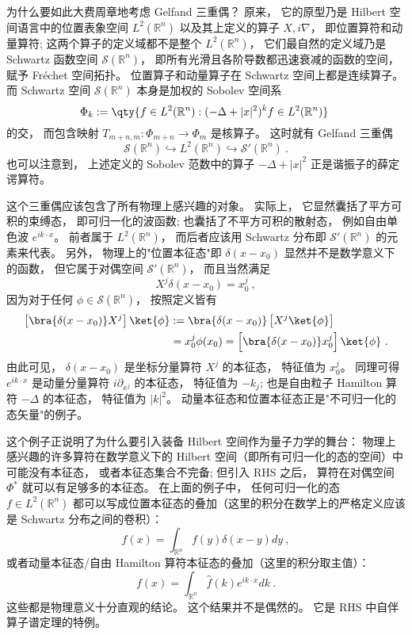     为什么要如此大费周章地考虑 Gelfand 三重偶？ 原来， 它的原型乃是 Hilbert 空间语言中的位置表象空间 $L^2(\mathbb{R}^n)$ 以及其上定义的算子 $X,i\nabla$， 即位置算符和动量算符; 这两个算子的定义域都不是整个 $L^2(\mathbb{R}^n)$， 它们最自然的定义域乃是 Schwartz 函数空间 $\mathcal{S}(\mathbb{R}^n)$， 即所有光滑且各阶导数都迅速衰减的函数的空间， 赋予 Fréchet 空间拓扑。 位置算子和动量算子在 Schwartz 空间上都是连续算子。 而 Schwartz 空间 $\mathcal{S}(\mathbb{R}^n)$ 本身是加权的 Sobolev 空间系
$$
\Phi_k := \qty{f \in L^2 (\mathbb{R}^n): (-\Delta + |x|^ 2)^{k} f \in L^2 (\mathbb{R}^n) }~
$$
的交， 而包含映射 $T_{m+n,m}:\Phi_{m+n}\to\Phi_m$ 是核算子。 这时就有 Gelfand 三重偶$$
\mathcal{S}(\mathbb{R}^n)\hookrightarrow L^2(\mathbb{R}^n)\hookrightarrow \mathcal{S}'(\mathbb{R}^n)~.
$$也可以注意到， 上述定义的 Sobolev 范数中的算子 $-\Delta+|x|^2$ 正是谐振子的薛定谔算符。

    这个三重偶应该包含了所有物理上感兴趣的对象。 实际上， 它显然囊括了平方可积的束缚态， 即可归一化的波函数; 也囊括了不平方可积的散射态， 例如自由单色波 $e^{ik\cdot x}$。 前者属于 $L^2(\mathbb{R}^n)$， 而后者应该用 Schwartz 分布即 $\mathcal{S}'(\mathbb{R}^n)$ 的元素来代表。 另外， 物理上的"位置本征态"即 $\delta(x-x_0)$ 显然并不是数学意义下的函数， 但它属于对偶空间 $\mathcal{S}'(\mathbb{R}^n)$， 而且当然满足
$$
X^j\delta(x-x_0)=x_0^j~,
$$
因为对于任何 $\phi\in\mathcal{S}(\mathbb{R}^n)$， 按照定义皆有
$$
\begin{aligned}
\left[\bra{\delta(x-x_0)}X^j\right]\ket{\phi}
&:=\bra{\delta(x-x_0)}\left[X^j\ket{\phi}\right]\\
&=x_0^j\phi(x_0)
=\left[\bra{\delta(x-x_0)}x_0^j\right]\ket{\phi}~.
\end{aligned}
$$
由此可见， $\delta(x-x_0)$ 是坐标分量算符 $X^j$ 的本征态， 特征值为 $x_0^j$。 同理可得 $e^{ik\cdot x}$ 是动量分量算符 $i\partial_{x^j}$ 的本征态， 特征值为 $-k_j$; 也是自由粒子 Hamilton 算符 $-\Delta$ 的本征态， 特征值为 $|k|^2$。 动量本征态和位置本征态正是"不可归一化的态矢量"的例子。 

    这个例子正说明了为什么要引入装备 Hilbert 空间作为量子力学的舞台： 物理上感兴趣的许多算符在数学意义下的 Hilbert 空间（即所有可归一化的态的空间）中可能没有本征态， 或者本征态集合不完备; 但引入 RHS 之后， 算符在对偶空间 $\Phi^*$ 就可以有足够多的本征态。 在上面的例子中， 任何可归一化的态 $f\in{L^2}(\mathbb{R}^n)$ 都可以写成位置本征态的叠加（这里的积分在数学上的严格定义应该是 Schwartz 分布之间的卷积）：
$$
f(x)=\int_{\mathbb{R}^n}f(y)\delta(x-y)dy~,
$$    
或者动量本征态/自由 Hamilton 算符本征态的叠加（这里的积分取主值）：
$$
f(x)=\int_{\mathbb{R}^n}\hat f(k)e^{ik\cdot x}dk~.
$$
这些都是物理意义十分直观的结论。 这个结果并不是偶然的。 它是 RHS 中自伴算子谱定理的特例。
